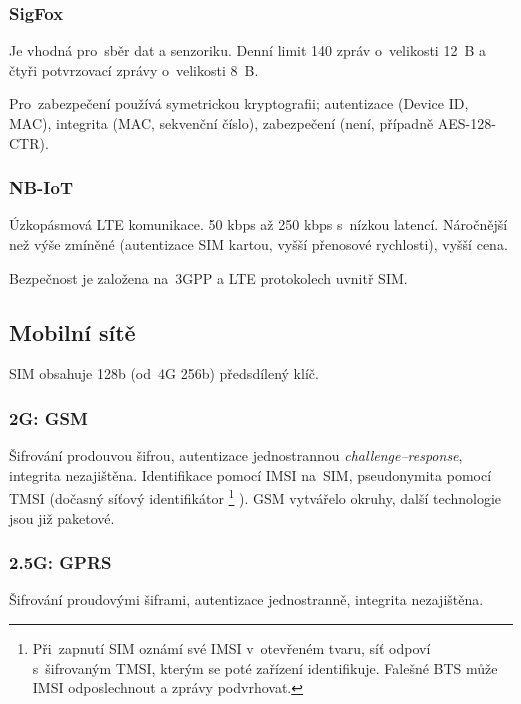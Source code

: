 \subsubsection{SigFox}


Je vhodná pro~sběr dat a senzoriku.
Denní limit 140 zpráv o~velikosti 12~B a čtyři potvrzovací zprávy o~velikosti 8~B.

Pro~zabezpečení používá symetrickou kryptografii; autentizace (Device ID, MAC), integrita (MAC, sekvenční číslo), zabezpečení (není, případně AES-128-CTR).


\subsubsection{NB-IoT}

Úzkopásmová LTE komunikace.
50 kbps až 250 kbps s~nízkou latencí.
Náročnější než výše zmíněné (autentizace SIM kartou, vyšší přenosové rychlosti), vyšší cena.

Bezpečnost je založena na~3GPP a LTE protokolech uvnitř SIM.


\subsection{Mobilní sítě}

SIM obsahuje 128b (od~4G 256b) předsdílený klíč.



\subsubsection{2G: GSM}

Šifrování prodouvou šifrou, autentizace jednostrannou \emph{challenge--response}, integrita nezajištěna.
Identifikace pomocí IMSI na~SIM, pseudonymita pomocí TMSI (dočasný síťový identifikátor%
\footnote{Při~zapnutí SIM oznámí své IMSI v~otevřeném tvaru, síť odpoví s~šifrovaným TMSI, kterým se poté zařízení identifikuje. Falešné BTS může IMSI odposlechnout a zprávy podvrhovat.}%
).
GSM vytvářelo okruhy, další technologie jsou již paketové.


\subsubsection{2.5G: GPRS}

Šifrování proudovými šiframi, autentizace jednostranně, integrita nezajištěna.

